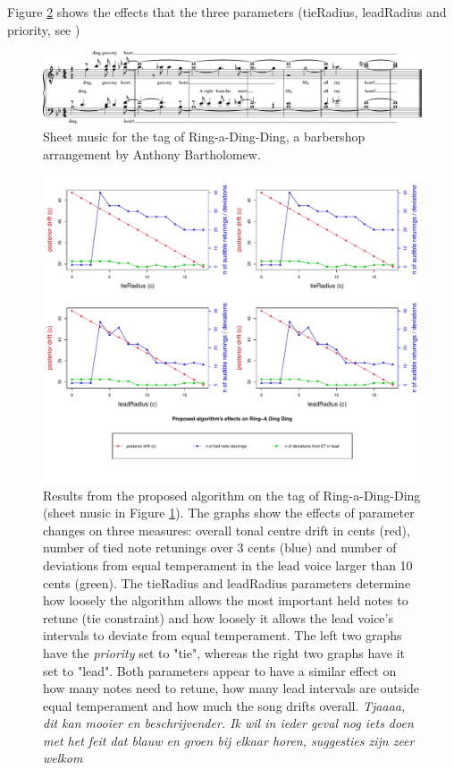 \documentclass[a4paper]{article}
\begin{document}
Figure \ref{fig:results} shows the effects that the three parameters (tieRadius, leadRadius and priority, see )

\begin{figure}
	\centering
	\includegraphics[width=\linewidth]{Figures/Ding_MuseScore.pdf}
	\caption{Sheet music for the tag of Ring-a-Ding-Ding, a barbershop arrangement by Anthony Bartholomew.}
	\label{fig:ding_sheets}
\end{figure}

\begin{figure}
	\centering
	\includegraphics[width=\linewidth]{Results/effects_ring.pdf}
	\caption{Results from the proposed algorithm on the tag of Ring-a-Ding-Ding (sheet music in Figure \ref{fig:ding_sheets}). The graphs show the effects of parameter changes on three measures: overall tonal centre drift in cents (red), number of tied note retunings over 3 cents (blue) and number of deviations from equal temperament in the lead voice larger than 10 cents (green). The tieRadius and leadRadius parameters determine how loosely the algorithm allows the most important held notes to retune (tie constraint) and how loosely it allows the lead voice's intervals to deviate from equal temperament. The left two graphs have the \textit{priority} set to "tie", whereas the right two graphs have it set to "lead". Both parameters appear to have a similar effect on how many notes need to retune, how many lead intervals are outside equal temperament and how much the song drifts overall. \textit{\color{red}Tjaaaa, dit kan mooier en beschrijvender. Ik wil in ieder geval nog iets doen met het feit dat blauw en groen bij elkaar horen, suggesties zijn zeer welkom}}
	\label{fig:results}
\end{figure}
\end{document}
